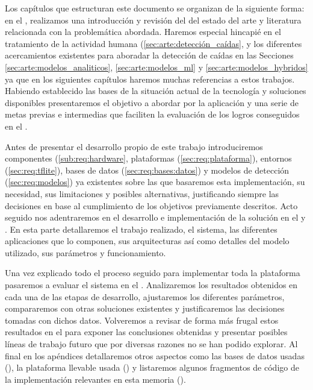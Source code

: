 Los capítulos que estructuran este documento se organizan de la siguiente forma: en el , realizamos una introducción y revisión del del estado del arte y literatura relacionada con la problemática abordada. Haremos especial hincapié en el tratamiento de la actividad humana (\autoref{sec:arte:detección_caídas}, y los diferentes acercamientos existentes para aboradar la detección de caídas en las Secciones \ref{sec:arte:modelos_analiticos}, \ref{sec:arte:modelos_ml} y \ref{sec:arte:modelos_hybridos} ya que en los siguientes capítulos haremos muchas referencias a estos trabajos. Habiendo establecido las bases de la situación actual de la tecnología y soluciones disponibles presentaremos el objetivo a abordar por la aplicación y una serie de metas previas e intermedias que faciliten la evaluación de los logros conseguidos en el .

Antes de presentar el desarrollo propio de este trabajo introduciremos componentes (\ref{sub:req:hardware}, plataformas (\ref{sec:req:plataforma}), entornos (\ref{sec:req:tflite}), bases de datos (\ref{sec:req:bases:datos}) y modelos de detección (\ref{sec:req:modelos}) ya existentes sobre las que basaremos esta implementación, su necesidad, sus limitaciones y posibles alternativas, justificando siempre las decisiones en base al cumplimiento de los objetivos previamente descritos. Acto seguido nos adentraremos en el desarrollo e implementación de la solución en el  y . En esta parte detallaremos el trabajo realizado, el sistema, las diferentes aplicaciones que lo componen, sus arquitecturas así como detalles del modelo utilizado, sus parámetros y funcionamiento.

Una vez explicado todo el proceso seguido para implementar toda la plataforma pasaremos a evaluar el sistema en el . Analizaremos los resultados obtenidos en cada una de las etapas de desarrollo, ajustaremos los diferentes parámetros, compararemos con otras soluciones existentes y justificaremos las decisiones tomadas con dichos datos. Volveremos a revisar de forma más frugal estos resultados en el  para exponer las conclusiones obtenidas y presentar posibles líneas de trabajo futuro que por diversas razones no se han podido explorar. Al final en los apéndices detallaremos otros aspectos como las bases de datos usadas (), la plataforma llevable usada () y listaremos algunos fragmentos de código de la implementación relevantes en esta memoria ().

